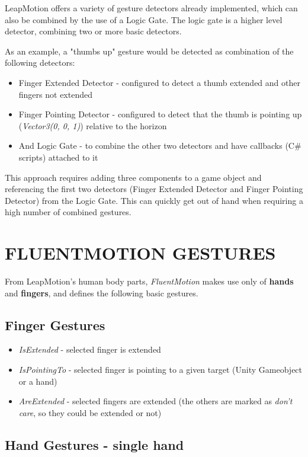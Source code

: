 \documentclass{sigchi}
\def\fluentmotion{\textit{FluentMotion}}
\def\leap{LeapMotion}
\begin{document}
\leap{} offers a variety of gesture detectors already implemented, which can also be combined by the use of a Logic Gate. The logic gate is a higher level detector, combining two or more basic detectors.


As an example, a "thumbs up" gesture would be detected as combination of the following detectors:

\begin{itemize}
  \item Finger Extended Detector - configured to detect a thumb extended and other fingers not extended
  \item Finger Pointing Detector - configured to detect that the thumb is pointing up (\textit{Vector3(0, 0, 1)}) relative to the horizon
  \item And Logic Gate - to combine the other two detectors and have callbacks (C\# scripts) attached to it
\end{itemize}

This approach requires adding three components to a game object and referencing the first two detectors (Finger Extended Detector and Finger Pointing Detector) from the Logic Gate. This can quickly get out of hand when requiring a high number of combined gestures.

\section{FLUENTMOTION GESTURES}

From \leap{}'s human body parts, \fluentmotion{} makes use only of \textbf{hands} and \textbf{fingers}, and defines the following basic gestures.

\subsection{Finger Gestures}
\begin{itemize}
  \item \textit{IsExtended} - selected finger is extended
  \item \textit{IsPointingTo} - selected finger is pointing to a given target (Unity Gameobject or a hand)
  \item \textit{AreExtended} - selected fingers are extended (the others are marked as \textit{don't care}, so they could be extended or not)
\end{itemize}

\subsection{Hand Gestures - single hand}
\end{document}
